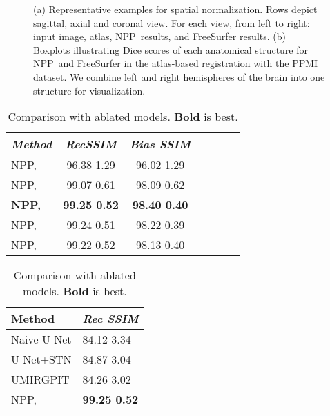 \documentclass[runningheads]{llncs}
\newcommand{\modelname}{NPP}
\begin{document}
\begin{figure}[t]\centering
    \caption{(a) Representative examples for spatial normalization. Rows depict sagittal, axial and coronal view. For each view, from left to right: input image, atlas, \modelname~results, and FreeSurfer results. (b) Boxplots illustrating Dice scores of each anatomical structure for \modelname~and FreeSurfer in the atlas-based registration with the PPMI dataset. We combine left and right hemispheres of the brain into one structure for visualization.}\label{fig_ab}\end{figure}





\begin{table}[b]
\parbox[t]{.45\linewidth}{\vspace{0pt}
\centering
\caption{Ablation study results of different . \textbf{Bold} is best.}\label{tab_a}

\begin{tabular}{|l|*{6}{c|}}
\hline
\textit{Method} &  \textit{RecSSIM}  & \textit{Bias SSIM}\\\hline
\modelname,  & 96.38  1.29& 96.02  1.29\\
\modelname,  & 99.07  0.61& 98.09  0.62\\
\textbf{\modelname, } & \textbf{99.25  0.52} & \textbf{98.40  0.40}\\ 
\modelname,  & 99.24  0.51& 98.22 0.39\\
\modelname,  & 99.22  0.52& 98.13  0.40\\
\hline
  \end{tabular}
}
\hfill
  \parbox[t]{.45\linewidth}{\vspace{0pt}
\centering
  \caption{Comparison with ablated models. \textbf{Bold} is best.}\label{tab_ad}

\begin{tabular}{|l|l|}
\hline
 Method&\textit{Rec SSIM}\\\hline
Naive U-Net &  84.12  3.34 \\
U-Net+STN &  84.87 3.04   \\
UMIRGPIT & 84.26   3.02 
\\\hdashline
\modelname,  & \textbf{99.25  0.52}  \\
\hline
\end{tabular}
}
\end{table}
\end{document}
